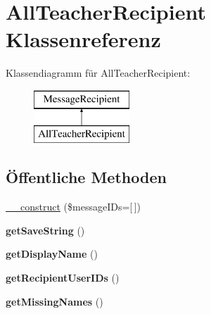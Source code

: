 \hypertarget{class_all_teacher_recipient}{}\section{All\+Teacher\+Recipient Klassenreferenz}
\label{class_all_teacher_recipient}
Klassendiagramm für All\+Teacher\+Recipient\+:\begin{figure}[H]
\begin{center}
\leavevmode
\includegraphics[height=2.000000cm]{class_all_teacher_recipient}
\end{center}
\end{figure}
\subsection*{Öffentliche Methoden}
\begin{DoxyCompactItemize}
\item 
\mbox{\hyperlink{class_all_teacher_recipient_ad7152dc4116e3ee9fd1293cd73b743c2}{\+\_\+\+\_\+construct}} (\$message\+I\+Ds=\mbox{[}$\,$\mbox{]})
\item 
\mbox{\label{class_all_teacher_recipient_a0f8393e73b85ca000a139ff979eb1723}} 
{\bfseries get\+Save\+String} ()
\item 
\mbox{\label{class_all_teacher_recipient_ab8f12d75ff986f56a585f7694d4a6caa}} 
{\bfseries get\+Display\+Name} ()
\item 
\mbox{\label{class_all_teacher_recipient_aebdbcac3ddff4684ee31c601592b3fa7}} 
{\bfseries get\+Recipient\+User\+I\+Ds} ()
\item 
\mbox{\label{class_all_teacher_recipient_acdb24191e68508cf38b46fd2acb5bf70}} 
{\bfseries get\+Missing\+Names} ()
\end{DoxyCompactItemize}

